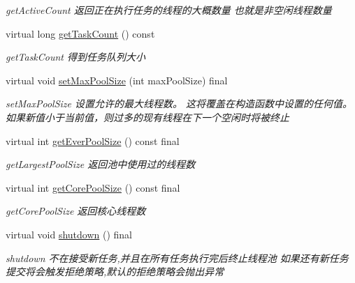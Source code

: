 \begin{DoxyCompactItemize}
\begin{DoxyCompactList}\small\item\em get\+Active\+Count 返回正在执行任务的线程的大概数量 也就是非空闲线程数量 \end{DoxyCompactList}\item 
virtual long \hyperlink{classThreadPoolExecutor_a61e8321202e6b0f6ea014485e8e10450}{get\+Task\+Count} () const
\begin{DoxyCompactList}\small\item\em get\+Task\+Count 得到任务队列大小 \end{DoxyCompactList}\item 
virtual void \hyperlink{classThreadPoolExecutor_ac5a10d336958ca43530b31bff81c9c4b}{set\+Max\+Pool\+Size} (int max\+Pool\+Size) final
\begin{DoxyCompactList}\small\item\em set\+Max\+Pool\+Size 设置允许的最大线程数。 这将覆盖在构造函数中设置的任何值。 如果新值小于当前值，则过多的现有线程在下一个空闲时将被终止 \end{DoxyCompactList}\item 
virtual int \hyperlink{classThreadPoolExecutor_af630e5117b4f67428a4fcbee5c15a7d9}{get\+Ever\+Pool\+Size} () const final
\begin{DoxyCompactList}\small\item\em get\+Largest\+Pool\+Size 返回池中使用过的线程数 \end{DoxyCompactList}\item 
virtual int \hyperlink{classThreadPoolExecutor_af29377a50af53031bb06aeacf9ef27f7}{get\+Core\+Pool\+Size} () const final
\begin{DoxyCompactList}\small\item\em get\+Core\+Pool\+Size 返回核心线程数 \end{DoxyCompactList}\item 
\mbox{\label{classThreadPoolExecutor_aaa834c4350d6b12826803bb13dd467ea}} 
virtual void \hyperlink{classThreadPoolExecutor_aaa834c4350d6b12826803bb13dd467ea}{shutdown} () final
\begin{DoxyCompactList}\small\item\em shutdown 不在接受新任务,并且在所有任务执行完后终止线程池 如果还有新任务提交将会触发拒绝策略,默认的拒绝策略会抛出异常 \end{DoxyCompactList}\item 
\mbox{\label{classThreadPoolExecutor_a588ec33baf402afd0e1c52b11d9234da}} 

\end{DoxyCompactItemize}
